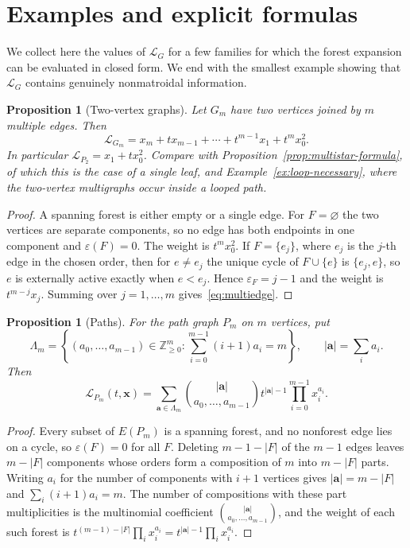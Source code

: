 \documentclass[11pt]{article}
\theoremstyle{plain}
\newtheorem{proposition}[theorem]{Proposition}
\theoremstyle{definition}
\renewcommand{\mathcal}{\mathscr}
\newcommand{\ds}{\displaystyle}
\newcommand{\LL}{\mathcal{L}}    %
\newcommand{\ba}{\mathbf{a}}
\newcommand{\bx}{\mathbf{x}}
\newcommand{\eps}{\varepsilon}
\newcommand{\ZZ}{\mathbb Z}
\numberwithin{equation}{section}
\begin{document}
\section{Examples and explicit formulas}\label{sec:examples}

We collect here the values of $\LL_G$ for a few families for which the forest expansion can
be evaluated in closed form.  We end with the smallest example showing that
$\LL_G$ contains genuinely nonmatroidal information.

\begin{proposition}[Two-vertex graphs]\label{prop:multiedge}
Let $G_m$ have two vertices joined by $m$ multiple edges.  Then
\begin{equation}\label{eq:multiedge}
 \LL_{G_m}=x_m+tx_{m-1}+\cdots+t^{m-1}x_1+t^mx_0^2 .
\end{equation}
In particular $\LL_{P_2}=x_1+tx_0^2$.  Compare with
Proposition~\ref{prop:multistar-formula}, of which this is the case of a single
leaf, and Example~\ref{ex:loop-necessary}, where the two-vertex multigraphs
occur inside a looped path.
\end{proposition}

\begin{proof}
A spanning forest is either empty or a single edge.  For $F=\varnothing$ the
two vertices are separate components, so no edge has both endpoints in one
component and $\eps(F)=0$.  The weight is $t^{m}x_0^2$.  If
$F=\{e_j\}$, where $e_j$ is the $j$-th edge in the chosen order, then for
$e\ne e_j$ the unique cycle of $F\cup\{e\}$ is $\{e_j,e\}$, so $e$ is
externally active exactly when $e<e_j$.  Hence
$\eps_F=j-1$ and the weight is $t^{m-j}x_{j}$.  Summing over
$j=1,\dots,m$ gives~\eqref{eq:multiedge}.
\end{proof}

\begin{proposition}[Paths]\label{prop:path}
For the path graph $P_m$ on $m$ vertices, put
\[
 \Lambda_m=\left\{(a_0,\ldots,a_{m-1})\in\ZZ_{\ge 0}^{m}:
 \sum_{i=0}^{m-1}(i+1)a_i=m\right\},\qquad |\ba|=\sum_i a_i.
\]
Then
\begin{equation}\label{eq:path}
 \LL_{P_m}(t,\bx)=
 \sum_{\ba\in\Lambda_m}
 \binom{|\ba|}{a_0,\ldots,a_{m-1}}
 t^{|\ba|-1}\prod_{i=0}^{m-1}x_i^{a_i}.
\end{equation}
\end{proposition}

\begin{proof}
Every subset of $E(P_m)$ is a spanning forest, and no nonforest edge lies on
a cycle, so $\eps(F)=0$ for all $F$.  Deleting $m-1-|F|$ of the $m-1$
edges leaves $m-|F|$ components whose orders form a composition of $m$ into
$m-|F|$ parts. Writing $a_i$ for the number of components with $i+1$ vertices
gives $|\ba|=m-|F|$ and $\sum_i(i+1)a_i=m$.  The number of compositions with
these part multiplicities is the multinomial coefficient
$\ds \binom{|\ba|}{a_0,\ldots,a_{m-1}}$, and the weight of each such forest is
$t^{(m-1)-|F|}\prod_i x_i^{a_i}=t^{|\ba|-1}\prod_i x_i^{a_i}$.
\end{proof}
\end{document}
